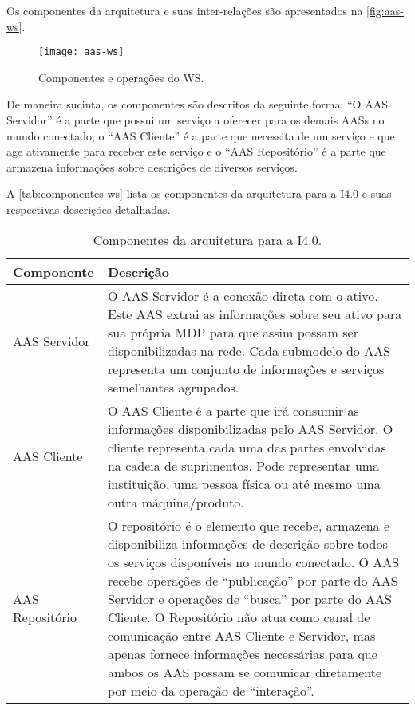 	Os componentes da arquitetura e suas inter-relações são apresentados na \autoref{fig:aas-ws}.
	
	\begin{figure}[htb]
		\centering
		\caption{Componentes e operações do WS.}
		\label{fig:aas-ws}
		\texttt{[image: aas-ws]}
	\end{figure}

	De maneira sucinta, os componentes são descritos da seguinte forma: ``O AAS Servidor'' é a parte que possui um serviço a oferecer para os demais AASs no mundo conectado, o ``AAS Cliente'' é a parte que necessita de um serviço e que age ativamente para receber este serviço e o ``AAS Repositório'' é a parte que armazena informações sobre descrições de diversos serviços.
	
	A \autoref{tab:componentes-ws} lista os componentes da arquitetura para a I4.0 e suas respectivas descrições detalhadas.
	
	\begin{table}[htb]
		\centering
		\caption{Componentes da arquitetura para a I4.0.}
		\label{tab:componentes-ws}
		\begin{tabular}{p{3cm}p{12cm}}
			\hline
			\textbf{Componente}
			& \textbf{Descrição} \\ 
			
			\hline
			AAS Servidor
			& O AAS Servidor é a conexão direta com o ativo. Este AAS extrai as informações sobre seu ativo para sua própria MDP para que assim possam ser disponibilizadas na rede. Cada submodelo do AAS representa um conjunto de informações e serviços semelhantes agrupados. \\
			
			\hline
			AAS Cliente
			& O AAS Cliente é a parte que irá consumir as informações disponibilizadas pelo AAS Servidor. O cliente representa cada uma das partes envolvidas na cadeia de suprimentos. Pode representar uma instituição, uma pessoa física ou até mesmo uma outra máquina/produto. \\
			
			\hline
			AAS Repositório
			& O repositório é o elemento que recebe, armazena e disponibiliza informações de descrição sobre todos os serviços disponíveis no mundo conectado. O AAS recebe operações de ``publicação'' por parte do AAS Servidor e operações de ``busca'' por parte do AAS Cliente. O Repositório não atua como canal de comunicação entre AAS Cliente e Servidor, mas apenas fornece informações necessárias para que ambos os AAS possam se comunicar diretamente por meio da operação de ``interação''. \\
			
			\hline
		\end{tabular}
	\end{table}
	
